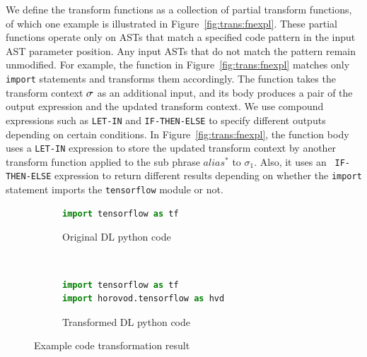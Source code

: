 We define the transform functions as a collection of partial transform
functions, of which one example is illustrated in
Figure~\ref{fig:trans:fnexpl}. 
These partial functions operate only on ASTs that match a specified code
pattern in the input AST parameter position. 
Any input ASTs that do not match the pattern remain unmodified. 
For example, the function in Figure~\ref{fig:trans:fnexpl} matches only {\tt
import} statements and transforms them accordingly. 
The function takes the transform context $\sigma$ as an additional input, and
its body produces a pair of the output expression and the updated transform
context. 
We use compound expressions such as {\tt LET-IN} and {\tt IF-THEN-ELSE} to
specify different outputs depending on certain conditions. 
In Figure~\ref{fig:trans:fnexpl}, the function body uses a {\tt LET-IN}
expression to store the updated transform context by another transform function
applied to the sub phrase $alias^*$ to $\sigma_1$. 
Also, it uses an {\tt
IF-THEN-ELSE} expression to return different results depending on whether the
{\tt import} statement imports the {\tt tensorflow} module or not.

\begin{figure}[ht!]
    \centering
    \begin{subfigure}[b]{0.48\textwidth}
        \begin{lstlisting}[language=Python]
import tensorflow as tf\end{lstlisting}
        \caption{Original DL python code}
        \label{fig:trans:ex01:org}
    \end{subfigure}
    ~
    \begin{subfigure}[b]{0.48\textwidth}
        \begin{lstlisting}[language=Python]
import tensorflow as tf
import horovod.tensorflow as hvd\end{lstlisting}
        \caption{Transformed DL python code}
        \label{fig:trans:ex01:hvd}
    \end{subfigure}
    \caption{Example code transformation result}
    \label{fig:trans:ex01}
\end{figure}

